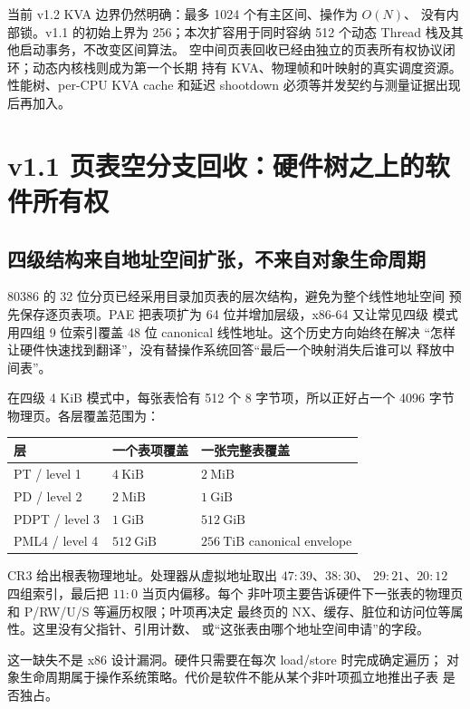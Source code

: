 当前 v1.2 KVA 边界仍然明确：最多 1024 个有主区间、操作为 \(O(N)\)、
没有内部锁。v1.1 的初始上界为 256；本次扩容用于同时容纳 512 个动态
Thread 栈及其他启动事务，不改变区间算法。
空中间页表回收已经由独立的页表所有权协议闭环；动态内核栈则成为第一个长期
持有 KVA、物理帧和叶映射的真实调度资源。性能树、per-CPU KVA cache 和延迟
shootdown 必须等并发契约与测量证据出现后再加入。

\section{v1.1 页表空分支回收：硬件树之上的软件所有权}

\subsection{四级结构来自地址空间扩张，不来自对象生命周期}

80386 的 32 位分页已经采用目录加页表的层次结构，避免为整个线性地址空间
预先保存逐页表项。PAE 把表项扩为 64 位并增加层级，x86-64 又让常见四级
模式用四组 9 位索引覆盖 48 位 canonical 线性地址。这个历史方向始终在解决
“怎样让硬件快速找到翻译”，没有替操作系统回答“最后一个映射消失后谁可以
释放中间表”。

在四级 4 KiB 模式中，每张表恰有 512 个 8 字节项，所以正好占一个 4096
字节物理页。各层覆盖范围为：

\begin{longtable}{@{}lll@{}}
\toprule
层 & 一个表项覆盖 & 一张完整表覆盖\\
\midrule
PT / level 1 & \(4\ \mathrm{KiB}\) & \(2\ \mathrm{MiB}\)\\
PD / level 2 & \(2\ \mathrm{MiB}\) & \(1\ \mathrm{GiB}\)\\
PDPT / level 3 & \(1\ \mathrm{GiB}\) & \(512\ \mathrm{GiB}\)\\
PML4 / level 4 & \(512\ \mathrm{GiB}\) & \(256\ \mathrm{TiB}\) canonical envelope\\
\bottomrule
\end{longtable}

CR3 给出根表物理地址。处理器从虚拟地址取出 \(47{:}39\)、\(38{:}30\)、
\(29{:}21\)、\(20{:}12\) 四组索引，最后把 \(11{:}0\) 当页内偏移。每个
非叶项主要告诉硬件下一张表的物理页和 P/RW/U/S 等遍历权限；叶项再决定
最终页的 NX、缓存、脏位和访问位等属性。这里没有父指针、引用计数、
 或“这张表由哪个地址空间申请”的字段。

这一缺失不是 x86 设计漏洞。硬件只需要在每次 load/store 时完成确定遍历；
对象生命周期属于操作系统策略。代价是软件不能从某个非叶项孤立地推出子表
是否独占。

